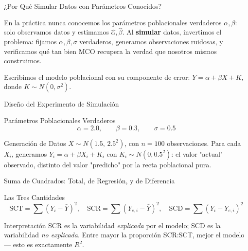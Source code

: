 \documentclass[10pt, aspectratio=169]{beamer}
\begin{document}
\begin{frame}{¿Por Qué Simular Datos con Parámetros Conocidos?}
  \footnotesize
  \begin{motivacion}
    En la práctica nunca conocemos los parámetros poblacionales verdaderos $\alpha,\beta$: solo observamos datos y estimamos $\hat\alpha,\hat\beta$. Al \textbf{simular} datos, invertimos el problema: fijamos $\alpha,\beta,\sigma$ verdaderos, generamos observaciones ruidosas, y verificamos qué tan bien MCO recupera la verdad que nosotros mismos construimos.
  \end{motivacion}

  \vspace{0.15cm}
  \pause
  Escribimos el modelo poblacional con su componente de error: $Y=\alpha+\beta X+K$, donde $K\sim N(0,\sigma^2)$.
\end{frame}

\begin{frame}{Diseño del Experimento de Simulación}
  \footnotesize
  \begin{block}{Parámetros Poblacionales Verdaderos}
    $$\alpha=2.0, \qquad \beta=0.3, \qquad \sigma=0.5$$
  \end{block}
  \pause

  \vspace{0.1cm}
  \begin{alertblock}{Generación de Datos}
    $X\sim N(1.5,\,2.5^2)$, con $n=100$ observaciones. Para cada $X_i$, generamos $Y_i=\alpha+\beta X_i+K_i$ con $K_i\sim N(0,0.5^2)$: el valor "actual" observado, distinto del valor "predicho" por la recta poblacional pura.
  \end{alertblock}
\end{frame}

\begin{frame}{Suma de Cuadrados: Total, de Regresión, y de Diferencia}
  \footnotesize
  \begin{block}{Las Tres Cantidades}
    $$\text{SCT}=\sum(Y_i-\bar Y)^2, \quad \text{SCR}=\sum(Y_{e,i}-\bar Y)^2, \quad \text{SCD}=\sum(Y_i-Y_{e,i})^2$$
  \end{block}
  \pause

  \vspace{0.1cm}
  \begin{alertblock}{Interpretación}
    SCR es la variabilidad \emph{explicada} por el modelo; SCD es la variabilidad \emph{no explicada}. Entre mayor la proporción SCR:SCT, mejor el modelo --- esto es exactamente $R^2$.
  \end{alertblock}
\end{frame}
\end{document}

